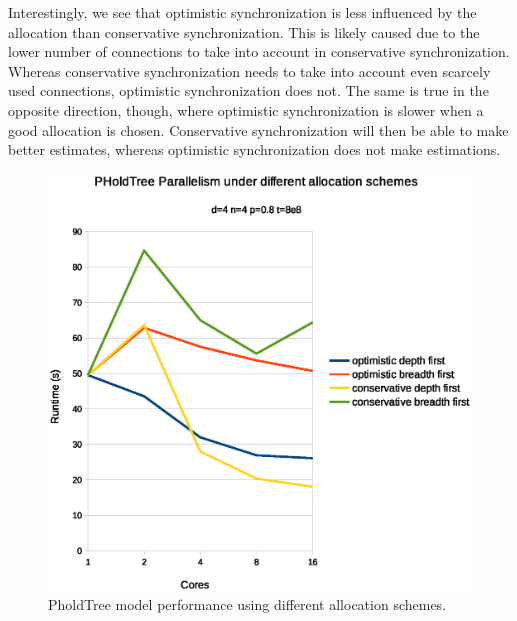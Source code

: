 Interestingly, we see that optimistic synchronization is less influenced by the allocation than conservative synchronization.
This is likely caused due to the lower number of connections to take into account in conservative synchronization.
Whereas conservative synchronization needs to take into account even scarcely used connections, optimistic synchronization does not.
The same is true in the opposite direction, though, where optimistic synchronization is slower when a good allocation is chosen.
Conservative synchronization will then be able to make better estimates, whereas optimistic synchronization does not make estimations.

\begin{figure}
    \center
    \includegraphics[width=\modelfraction\columnwidth]{fig/pholdtreeallochighp.eps}
    \caption{PholdTree model performance using different allocation schemes.}
    \label{fig:PholdTree_plot_alloc_high}
\end{figure}
